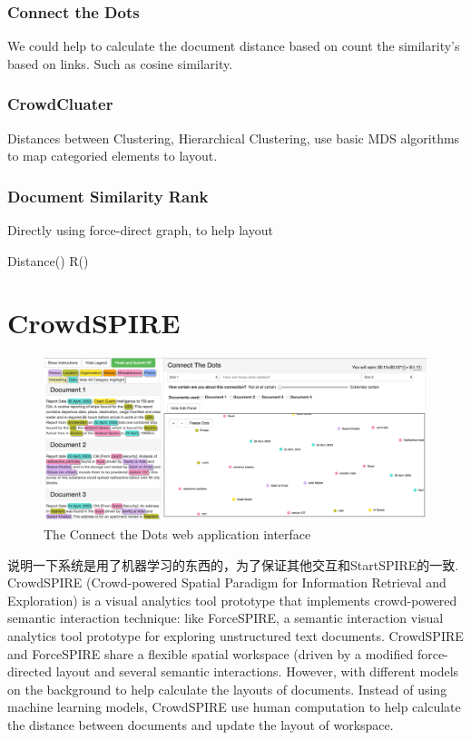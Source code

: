 \documentclass[journal]{vgtc}                %
\begin{document}
\subsubsection{Connect the Dots}
We could help to calculate the document distance based on count the similarity's based on links. Such as cosine similarity.


\subsubsection{CrowdCluater}

Distances between Clustering, Hierarchical Clustering, use basic MDS algorithms to map categoried elements to layout.


\subsubsection{Document Similarity Rank}
Directly using force-direct graph, to help layout

Distance() R()



\section{CrowdSPIRE}
\begin{figure}
 \centering
  \includegraphics[width=\textwidth]{Hit}
 \caption{The Connect the Dots web application interface}
 \label{fig:hit}
\end{figure}

说明一下系统是用了机器学习的东西的，为了保证其他交互和StartSPIRE的一致.
CrowdSPIRE (Crowd-powered Spatial Paradigm for Information Retrieval and Exploration) is a visual analytics tool prototype that implements crowd-powered semantic interaction technique: like ForceSPIRE, a semantic interaction visual analytics tool prototype for exploring unstructured text documents.
CrowdSPIRE and ForceSPIRE share a flexible spatial workspace (driven by a modified force-directed layout and several semantic interactions.
However, with different models on the background to help calculate the layouts of documents.
Instead of using machine learning models, CrowdSPIRE use human computation to help calculate the distance between documents and update the layout of workspace.
\end{document}
